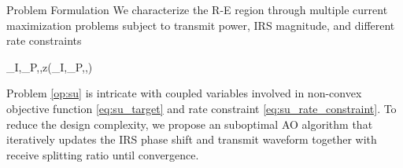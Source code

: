 \documentclass{IEEEtran}
\begin{document}
\begin{section}{Problem Formulation}
	We characterize the R-E region through multiple current maximization problems subject to transmit power, IRS magnitude, and different rate constraints
	\begin{maxi!}
		{_I,_P,\boldsymbol{\phi},\rho}{z(_I,_P,\boldsymbol{\phi},\rho)}{\label{op:su}}{\label{eq:su_target}}
		\label{eq:su_rate_constraint}
	\end{maxi!}
	Problem \ref{op:su} is intricate with coupled variables involved in non-convex objective function \ref{eq:su_target} and rate constraint \ref{eq:su_rate_constraint}. To reduce the design complexity, we propose an suboptimal AO algorithm that iteratively updates the IRS phase shift and transmit waveform together with receive splitting ratio until convergence.


\end{section}
\end{document}
